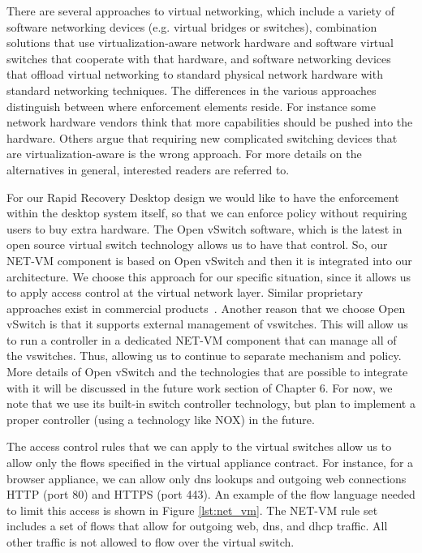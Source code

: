 There are several approaches to virtual networking, which include a variety of software networking devices (e.g. virtual bridges or switches), combination solutions that use virtualization-aware network hardware and software virtual switches that cooperate with that hardware, and software networking devices that offload virtual networking to standard physical network hardware with standard networking techniques. The differences in the various approaches distinguish between where enforcement elements reside. For instance some network hardware vendors think that more capabilities should be pushed into the hardware. Others argue that requiring new complicated switching devices that are virtualization-aware is the wrong approach. For more details on the alternatives in general, interested readers are referred to\cite{ovs_hotnets_2009, casado_hotnets_2008, cisco_nexus_website, vepa_2008, vntag_2008, vmware_vNetwork_Distributed_Switch_website}.

For our Rapid Recovery Desktop design we would like to have the enforcement within the desktop system itself, so that we can enforce policy without requiring users to buy extra hardware. The Open vSwitch software, which is the latest in open source virtual switch technology allows us to have that control. So, our NET-VM component is based on Open vSwitch and then it is integrated into our architecture. We choose this approach for our specific situation, since it allows us to apply access control at the virtual network layer. Similar proprietary approaches exist in commercial products~\cite{vmware_vNetwork_Distributed_Switch_website, cisco_nexus_website}. Another reason that we choose Open vSwitch is that it supports external management of vswitches. This will allow us to run a controller in a dedicated NET-VM component that can manage all of the vswitches. Thus, allowing us to continue to separate mechanism and policy. More details of Open vSwitch and the technologies that are possible to integrate with it will be discussed in the future work section of Chapter 6. For now, we note that we use its built-in switch controller technology, but plan to implement a proper controller (using a technology like NOX\cite{nox_website}) in the future.

The access control rules that we can apply to the virtual switches allow us to allow only the flows specified in the virtual appliance contract. For instance, for a browser appliance, we can allow only dns lookups and outgoing web connections HTTP (port 80) and HTTPS (port 443). An example of the flow language needed to limit this access is shown in Figure \ref{lst:net_vm}. The NET-VM rule set includes a set of flows that allow for outgoing web, dns, and dhcp traffic. All other traffic is not allowed to flow over the virtual switch.

